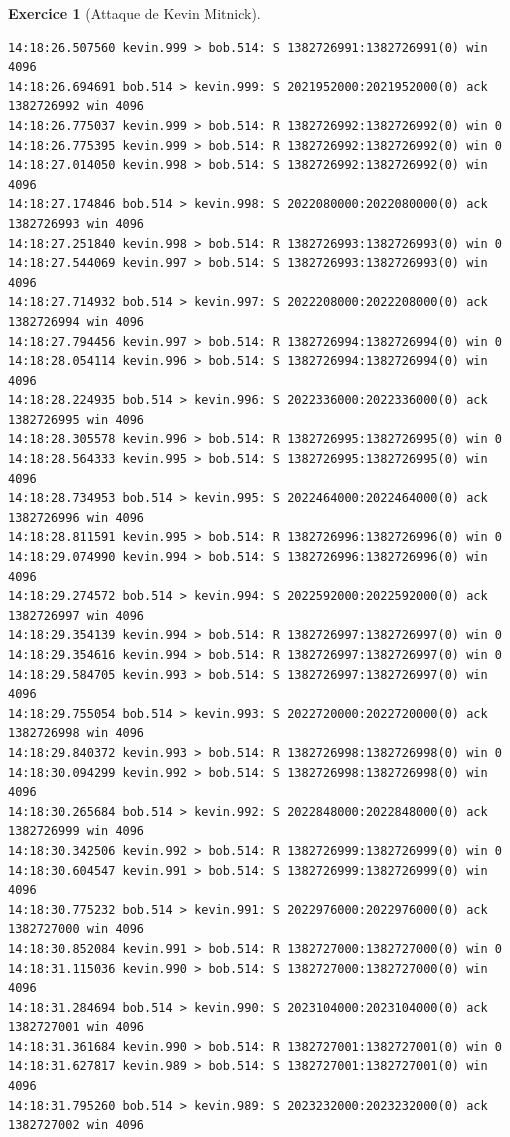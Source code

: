 \documentclass[a4paper,9pt]{article}
\theoremstyle{plain}
\theoremstyle{definition}
\newtheorem{exercice}{Exercice}
\begin{document}
\begin{exercice}[Attaque de Kevin Mitnick]
\begin{verbatim}
14:18:26.507560 kevin.999 > bob.514: S 1382726991:1382726991(0) win 4096
14:18:26.694691 bob.514 > kevin.999: S 2021952000:2021952000(0) ack 1382726992 win 4096
14:18:26.775037 kevin.999 > bob.514: R 1382726992:1382726992(0) win 0
14:18:26.775395 kevin.999 > bob.514: R 1382726992:1382726992(0) win 0
14:18:27.014050 kevin.998 > bob.514: S 1382726992:1382726992(0) win 4096
14:18:27.174846 bob.514 > kevin.998: S 2022080000:2022080000(0) ack 1382726993 win 4096
14:18:27.251840 kevin.998 > bob.514: R 1382726993:1382726993(0) win 0
14:18:27.544069 kevin.997 > bob.514: S 1382726993:1382726993(0) win 4096
14:18:27.714932 bob.514 > kevin.997: S 2022208000:2022208000(0) ack 1382726994 win 4096
14:18:27.794456 kevin.997 > bob.514: R 1382726994:1382726994(0) win 0
14:18:28.054114 kevin.996 > bob.514: S 1382726994:1382726994(0) win 4096
14:18:28.224935 bob.514 > kevin.996: S 2022336000:2022336000(0) ack 1382726995 win 4096
14:18:28.305578 kevin.996 > bob.514: R 1382726995:1382726995(0) win 0
14:18:28.564333 kevin.995 > bob.514: S 1382726995:1382726995(0) win 4096
14:18:28.734953 bob.514 > kevin.995: S 2022464000:2022464000(0) ack 1382726996 win 4096
14:18:28.811591 kevin.995 > bob.514: R 1382726996:1382726996(0) win 0
14:18:29.074990 kevin.994 > bob.514: S 1382726996:1382726996(0) win 4096
14:18:29.274572 bob.514 > kevin.994: S 2022592000:2022592000(0) ack 1382726997 win 4096
14:18:29.354139 kevin.994 > bob.514: R 1382726997:1382726997(0) win 0
14:18:29.354616 kevin.994 > bob.514: R 1382726997:1382726997(0) win 0
14:18:29.584705 kevin.993 > bob.514: S 1382726997:1382726997(0) win 4096
14:18:29.755054 bob.514 > kevin.993: S 2022720000:2022720000(0) ack 1382726998 win 4096
14:18:29.840372 kevin.993 > bob.514: R 1382726998:1382726998(0) win 0
14:18:30.094299 kevin.992 > bob.514: S 1382726998:1382726998(0) win 4096
14:18:30.265684 bob.514 > kevin.992: S 2022848000:2022848000(0) ack 1382726999 win 4096
14:18:30.342506 kevin.992 > bob.514: R 1382726999:1382726999(0) win 0
14:18:30.604547 kevin.991 > bob.514: S 1382726999:1382726999(0) win 4096
14:18:30.775232 bob.514 > kevin.991: S 2022976000:2022976000(0) ack 1382727000 win 4096
14:18:30.852084 kevin.991 > bob.514: R 1382727000:1382727000(0) win 0
14:18:31.115036 kevin.990 > bob.514: S 1382727000:1382727000(0) win 4096
14:18:31.284694 bob.514 > kevin.990: S 2023104000:2023104000(0) ack 1382727001 win 4096
14:18:31.361684 kevin.990 > bob.514: R 1382727001:1382727001(0) win 0
14:18:31.627817 kevin.989 > bob.514: S 1382727001:1382727001(0) win 4096
14:18:31.795260 bob.514 > kevin.989: S 2023232000:2023232000(0) ack 1382727002 win 4096

\end{verbatim}
\end{exercice}
\end{document}
